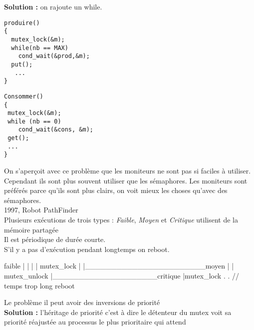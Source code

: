 \documentclass[12pt,a4paper]{report}
\begin{document}
\textbf{Solution :} on rajoute un while.\\
\begin{minipage}{0.5\linewidth}
\begin{verbatim}
produire()
{
  mutex_lock(&m);
  while(nb == MAX)
    cond_wait(&prod,&m);
  put();
   ...
}
\end{verbatim}
\end{minipage}
\begin{minipage}{0.5\linewidth}
\begin{verbatim}
Consommer()
{
 mutex_lock(&m);
 while (nb == 0)
    cond_wait(&cons, &m);
 get();   
 ...
}
\end{verbatim}
\end{minipage}


On s’aperçoit avec ce problème que les moniteurs ne sont pas si faciles à utiliser. Cependant ils sont plus souvent utiliser que les sémaphores. Les moniteurs sont préférés parce qu'ils sont plus clairs, on voit mieux les choses qu'avec des sémaphores.\\

1997, Robot PathFinder\\
Plusieurs exécutions de trois types : \emph{Faible}, \emph{Moyen} et \emph{Critique} utilisent de la mémoire partagée\\
Il est périodique de durée courte.\\
S'il y a pas d'exécution pendant longtemps on reboot.

\begin{verbatimtab}
faible
  |
  |
  |  
  |
mutex_lock
  |
  |_______________________moyen   
                            |
                            |
mutex_unlock                |____________________critique
                                                    |mutex_lock
													.
													.      // temps trop long
												reboot
\end{verbatimtab}

Le problème il peut avoir des inversions de priorité\\
\textbf{Solution :} l'héritage de priorité c'est à dire le détenteur du mutex voit sa priorité réajustée au processus le plus prioritaire qui attend\\



\end{document}
